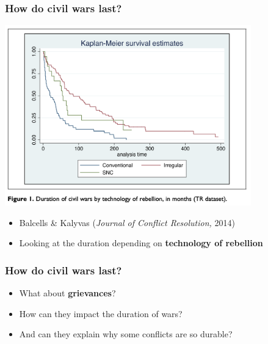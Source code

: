 \documentclass[aspectratio=43]{beamer}
\begin{document}
\begin{frame}
\frametitle{How  do civil wars last?}
\centering

\includegraphics[width = 0.8\textwidth]{img/balcells_kalyvas_duration}


\begin{itemize}
  \item Balcells \& Kalyvas (\textit{Journal of Conflict Resolution,} 2014)
  \item Looking at the duration depending on \textbf{technology of rebellion}
\end{itemize}


\end{frame}


\begin{frame}
\frametitle{How  do civil wars last?}
\centering

\begin{itemize}
  \item What about \textbf{grievances}?
  \item How can they impact the duration of wars?
  \item And can they explain why some conflicts are so durable?
\end{itemize}

\end{frame}
\end{document}
